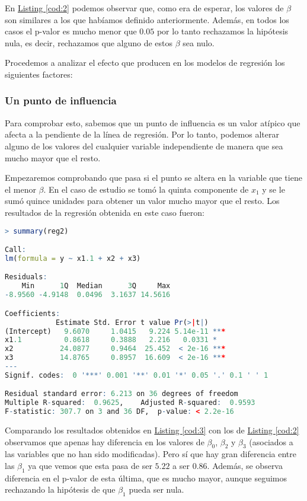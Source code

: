 \documentclass[12pt,a4paper]{article}
\begin{document}
En \hyperref[cod:2]{Listing \ref{cod:2}} podemos observar que, como era de esperar, los valores de $\beta$ son similares a los que habíamos definido anteriormente. Además, en todos los casos el p-valor es mucho menor que $0.05$ por lo tanto rechazamos la hipótesis nula, es decir, rechazamos que alguno de estos $\beta$ sea nulo.

Procedemos a analizar el efecto que producen en los modelos de regresión los siguientes factores:
\subsubsection{Un punto de influencia}
Para comprobar esto, sabemos que un punto de influencia es un valor atípico que afecta a la pendiente de la línea de regresión. Por lo tanto, podemos alterar alguno de los valores del cualquier variable independiente de manera que sea mucho mayor que el resto.

Empezaremos comprobando que pasa si el punto se altera en la variable que tiene el menor $\beta$. En el caso de estudio se tomó la quinta componente de $x_1$ y se le sumó quince unidades para obtener un valor mucho mayor que el resto. Los resultados de la regresión obtenida en este caso fueron:
\begin{lstlisting}[language=R, caption = Regresión lineal con un punto de influencia, label =cod:3]
> summary(reg2)

Call:
lm(formula = y ~ x1.1 + x2 + x3)

Residuals:
    Min      1Q  Median      3Q     Max 
-8.9560 -4.9148  0.0496  3.1637 14.5616 

Coefficients:
            Estimate Std. Error t value Pr(>|t|)    
(Intercept)   9.6070     1.0415   9.224 5.14e-11 ***
x1.1          0.8618     0.3888   2.216   0.0331 *  
x2           24.0877     0.9464  25.452  < 2e-16 ***
x3           14.8765     0.8957  16.609  < 2e-16 ***
---
Signif. codes:  0 '***' 0.001 '**' 0.01 '*' 0.05 '.' 0.1 ' ' 1

Residual standard error: 6.213 on 36 degrees of freedom
Multiple R-squared:  0.9625,	Adjusted R-squared:  0.9593 
F-statistic: 307.7 on 3 and 36 DF,  p-value: < 2.2e-16
\end{lstlisting}
Comparando los resultados obtenidos en \hyperref[cod:3]{Listing \ref{cod:3}} con los de \hyperref[cod:2]{Listing \ref{cod:2}} observamos que apenas hay diferencia en los valores de $\beta_0$, $\beta_2$ y $\beta_3$ (asociados a las variables que no han sido modificadas). Pero sí que hay gran diferencia entre las $\beta_1$ ya que vemos que esta pasa de ser $5.22$ a ser $0.86$. Además, se observa diferencia en el p-valor de esta última, que es mucho mayor, aunque seguimos rechazando la hipótesis de que $\beta_1$ pueda ser nula.
\end{document}
